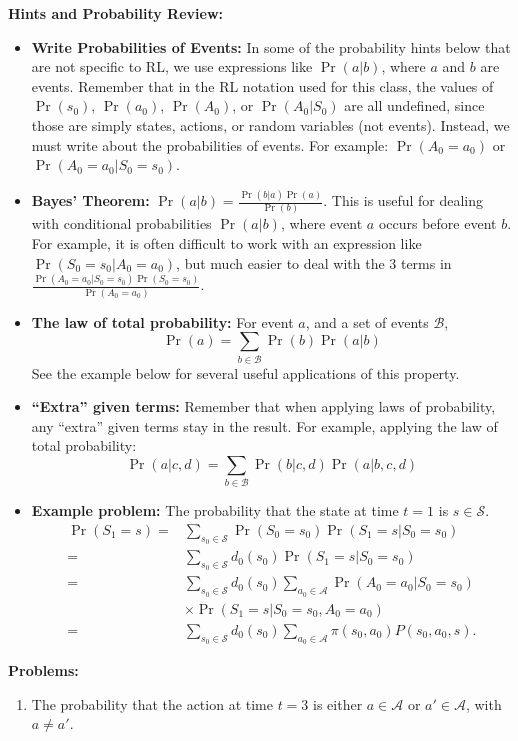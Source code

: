 \documentclass[]{article}
\begin{document}
\begin{enumerate}
    \textbf{Hints and Probability Review:}
    \begin{itemize}
        \item \textbf{Write Probabilities of Events:} In some of the probability hints below that are not specific to RL, we use expressions like $\Pr(a|b)$, where $a$ and $b$ are events.  Remember that in the RL notation used for this class, the values of $\Pr(s_0)$, $\Pr(a_0)$, $\Pr(A_0)$, or $\Pr(A_0 | S_0)$ are all undefined, since those are simply states, actions, or random variables (not events).  Instead, we must write about the probabilities of events.  For example: $\Pr(A_0 = a_0)$ or $\Pr(A_0 = a_0 | S_0 = s_0)$.
        \item \textbf{Bayes' Theorem:} $\Pr(a|b) = \frac{\Pr(b|a) \Pr(a)}{\Pr(b)}$. This is useful for dealing with conditional probabilities $\Pr(a|b)$, where event $a$ occurs before event $b$.  For example, it is often difficult to work with an expression like $\Pr(S_0 = s_0 | A_0 = a_0)$, but much easier to deal with the 3 terms in $\frac{\Pr(A_0 = a_0 | S_0 = s_0) \Pr(S_0 = s_0)}{\Pr(A_0 = a_0)}$.
        \item \textbf{The law of total probability:} For event $a$, and a set of events $\mathcal{B}$,
        $$\Pr(a) = \sum_{b \in \mathcal B} \Pr(b) \Pr(a|b)$$ See the example below for several useful applications of this property.
        \item \textbf{``Extra'' given terms:} Remember that when applying laws of probability, any ``extra'' given terms stay in the result.  For example, applying the law of total probability: $$\Pr(a|c,d) = \sum_{b \in \mathcal B} \Pr(b|c,d) \Pr(a|b,c,d)$$
        \item \textbf{Example problem:} The probability that the state at time $t = 1$ is $s \in \mathcal S$. 
        \begin{align}
        \Pr(S_1 = s) =& \sum_{s_0 \in \mathcal S} \Pr(S_0 = s_0) \Pr(S_1 = s | S_0 = s_0) \\
        =& \sum_{s_0\in \mathcal S} d_0(s_0) \Pr(S_1 = s | S_0 = s_0)\\
        =& \sum_{s_0\in \mathcal S} d_0(s_0) \sum_{a_0\in \mathcal A} \Pr(A_0 = a_0 | S_0 = s_0)\\
        &\times \Pr(S_1 = s | S_0 = s_0, A_0 = a_0)\\
        =& \sum_{s_0\in \mathcal S} d_0(s_0) \sum_{a_0\in \mathcal A} \pi(s_0, a_0) P(s_0, a_0, s).
        \end{align}
    \end{itemize}
    \textbf{Problems:}\\
    \begin{enumerate}[label=\Alph*]
        \item The probability that the action at time $t=3$ is either $ a \in \mathcal A$ or $a' \in \mathcal A$, with $a \ne a'$.
        \\



\end{enumerate}
\end{enumerate}
\end{document}
